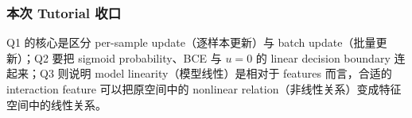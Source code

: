 \subsubsection*{本次 Tutorial 收口}

Q1 的核心是区分 per-sample update（逐样本更新）与 batch update（批量更新）；Q2 要把 sigmoid probability、BCE 与 $u=0$ 的 linear decision boundary 连起来；Q3 则说明 model linearity（模型线性）是相对于 features 而言，合适的 interaction feature 可以把原空间中的 nonlinear relation（非线性关系）变成特征空间中的线性关系。
